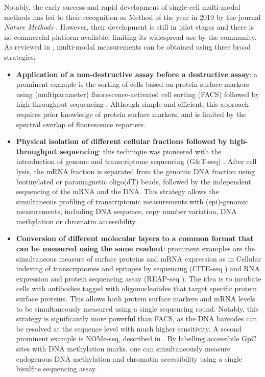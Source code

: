 Notably, the early success and rapid development of single-cell multi-modal methods has led to their recognition as Method of the year in 2019 by the journal \textit{Nature Methods} \cite{NatMethods2020}. However, their development is still in pilot stages and there is no commercial platform available, limiting its widespread use by the community. As reviewed in \cite{Stuart2019,Chappell2018}, multi-modal measurements can be obtained using three broad strategies:
\begin{itemize}
	
	\item \textbf{Application of a non-destructive assay before a destructive assay}: a prominent example is the sorting of cells based on protein surface markers using (multiparameter) fluorescence-activated cell sorting (FACS) followed by high-throughput sequencing \cite{Paul2015}. Although simple and efficient, this approach requires prior knowledge of protein surface markers, and is limited by the spectral overlap of fluorescence reporters.

	\item \textbf{Physical isolation of different cellular fractions followed by high-throughput sequencing}: this technique was pioneered with the introduction of genome and transcriptome sequencing (G\&T-seq) \cite{Macaulay2015}. After cell lysis, the mRNA fraction is separated from the genomic DNA fraction using biotinylated or paramagnetic oligo(dT) beads, followed by the independent sequencing of the mRNA and the DNA. This strategy allows the simultaneous profiling of transcriptomic measurements with (epi)-genomic measurements, including DNA sequence, copy number variation, DNA methylation or chromatin accessibility \cite{Macaulay2015,Hou2016,Angermueller2016,Hu2016}.

	\item \textbf{Conversion of different molecular layers to a common format that can be measured using the same readout}: prominent examples are the simultaneous measure of surface proteins and mRNA expression as in Cellular indexing of transcriptomes and epitopes by sequencing (CITE-seq \cite{Stoeckius2017}) and RNA expression and protein sequencing assay (REAP-seq \cite{Peterson2017}). The idea is to incubate cells with antibodies tagged with oligonucleotides that target specific protein surface proteins. This allows both protein surface markers and mRNA levels to be simultaneously measured using a single sequencing round. Notably, this strategy is significantly more powerful than FACS, as the DNA barcodes can be resolved at the sequence level with much higher sensitivity. A second prominent example is NOMe-seq, described in . By labelling accessibile GpC sites with DNA methylation marks, one can simultaneously measure endogenous DNA methylation and chromatin accessibility using a single bisulfite sequencing assay.
\end{itemize}


